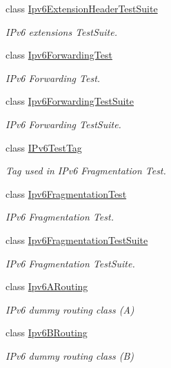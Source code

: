 \begin{DoxyCompactItemize}
class \hyperlink{classIpv6ExtensionHeaderTestSuite}{Ipv6\+Extension\+Header\+Test\+Suite}
\begin{DoxyCompactList}\small\item\em I\+Pv6 extensions Test\+Suite. \end{DoxyCompactList}\item 
class \hyperlink{classIpv6ForwardingTest}{Ipv6\+Forwarding\+Test}
\begin{DoxyCompactList}\small\item\em I\+Pv6 Forwarding Test. \end{DoxyCompactList}\item 
class \hyperlink{classIpv6ForwardingTestSuite}{Ipv6\+Forwarding\+Test\+Suite}
\begin{DoxyCompactList}\small\item\em I\+Pv6 Forwarding Test\+Suite. \end{DoxyCompactList}\item 
class \hyperlink{classIPv6TestTag}{I\+Pv6\+Test\+Tag}
\begin{DoxyCompactList}\small\item\em Tag used in I\+Pv6 Fragmentation Test. \end{DoxyCompactList}\item 
class \hyperlink{classIpv6FragmentationTest}{Ipv6\+Fragmentation\+Test}
\begin{DoxyCompactList}\small\item\em I\+Pv6 Fragmentation Test. \end{DoxyCompactList}\item 
class \hyperlink{classIpv6FragmentationTestSuite}{Ipv6\+Fragmentation\+Test\+Suite}
\begin{DoxyCompactList}\small\item\em I\+Pv6 Fragmentation Test\+Suite. \end{DoxyCompactList}\item 
class \hyperlink{classIpv6ARouting}{Ipv6\+A\+Routing}
\begin{DoxyCompactList}\small\item\em I\+Pv6 dummy routing class (A) \end{DoxyCompactList}\item 
class \hyperlink{classIpv6BRouting}{Ipv6\+B\+Routing}
\begin{DoxyCompactList}\small\item\em I\+Pv6 dummy routing class (B) \end{DoxyCompactList}\item 

\end{DoxyCompactItemize}
